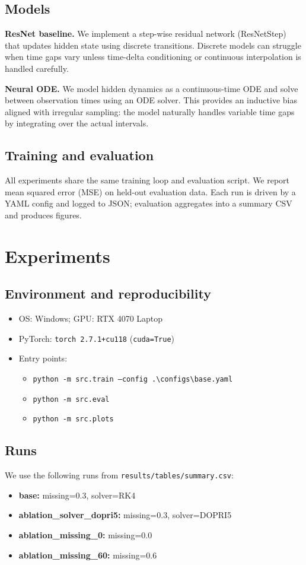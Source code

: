 ﻿\documentclass[10pt]{article}
\begin{document}
\subsection{Models}
\textbf{ResNet baseline.} We implement a step-wise residual network (ResNetStep) that updates hidden state using discrete transitions. Discrete models can struggle when time gaps vary unless time-delta conditioning or continuous interpolation is handled carefully.

\textbf{Neural ODE.} We model hidden dynamics as a continuous-time ODE and solve between observation times using an ODE solver. This provides an inductive bias aligned with irregular sampling: the model naturally handles variable time gaps by integrating over the actual intervals.

\subsection{Training and evaluation}
All experiments share the same training loop and evaluation script. We report mean squared error (MSE) on held-out evaluation data. Each run is driven by a YAML config and logged to JSON; evaluation aggregates into a summary CSV and produces figures.

\section{Experiments}
\subsection{Environment and reproducibility}
\begin{itemize}
  \item OS: Windows; GPU: RTX 4070 Laptop
  \item PyTorch: \texttt{torch 2.7.1+cu118} (\texttt{cuda=True})
  \item Entry points:
  \begin{itemize}
    \item \texttt{python -m src.train --config .\textbackslash configs\textbackslash base.yaml}
    \item \texttt{python -m src.eval}
    \item \texttt{python -m src.plots}
  \end{itemize}
\end{itemize}

\subsection{Runs}
We use the following runs from \texttt{results/tables/summary.csv}:
\begin{itemize}
  \item \textbf{base:} missing=0.3, solver=RK4
  \item \textbf{ablation\_solver\_dopri5:} missing=0.3, solver=DOPRI5
  \item \textbf{ablation\_missing\_0:} missing=0.0
  \item \textbf{ablation\_missing\_60:} missing=0.6
\end{itemize}
\end{document}
